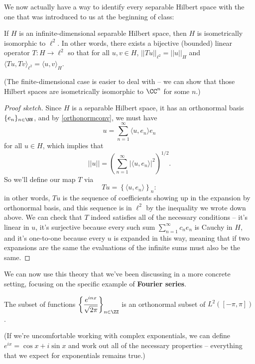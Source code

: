 We now actually have a way to identify every separable Hilbert space with the one that was introduced to us at the beginning of class:

\begin{theorem}
If $H$ is an infinite-dimensional separable Hilbert space, then $H$ is isometrically isomorphic to $\ell^2$. In other words, there exists a bijective (bounded) linear operator $T: H \to \ell^2$ so that for all $u, v \in H$, $||Tu||_{\ell^2} = ||u||_H$ and $\langle Tu, Tv \rangle_{\ell^2} = \langle u, v \rangle_H$.
\end{theorem}

(The finite-dimensional case is easier to deal with -- we can show that those Hilbert spaces are isometrically isomorphic to $\CC^n$ for some $n$.)

\begin{proof}[Proof sketch]
Since $H$ is a separable Hilbert space, it has an orthonormal basis $\{e_n\}_{n \in \NN}$, and by \cref{orthonormconv}, we must have
\[
    u = \sum_{n=1}^{\infty} \langle u, e_n \rangle e_n
\]
for all $u \in H$, which implies that
\[
    ||u|| = \left(\sum_{n=1}^{\infty} |\langle u, e_n \rangle|^2\right)^{1/2}.
\]
So we'll define our map $T$ via
\[
    Tu = \left\{\langle u, e_n \rangle\right\}_n:
\]
in other words, $Tu$ is the sequence of coefficients showing up in the expansion by orthonormal basis, and this sequence is in $\ell^2$ by the inequality we wrote down above. We can check that $T$ indeed satisfies all of the necessary conditions -- it's linear in $u$, it's surjective because every such sum $\sum_{n=1}^{\infty} c_n e_n$ is Cauchy in $H$, and it's one-to-one because every $u$ is expanded in this way, meaning that if two expansions are the same the evaluations of the infinite sums must also be the same.
\end{proof}

We can now use this theory that we've been discussing in a more concrete setting, focusing on the specific example of \textbf{Fourier series}. 

\begin{proposition}
The subset of functions $\left\{\dfrac{e^{inx}}{\sqrt{2\pi}}\right\}_{n \in \ZZ}$ is an orthonormal subset of $L^2([-\pi, \pi])$.
\end{proposition}

(If we're uncomfortable working with complex exponentials, we can define $e^{ix} = \cos x + i \sin x$ and work out all of the necessary properties -- everything that we expect for exponentials remains true.)

